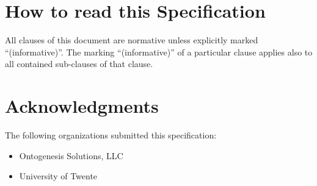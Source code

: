 
\section{How to read this Specification}



All clauses of this document are normative unless explicitly marked ``(informative)''. The marking ``(informative)'' of a particular clause applies also to all contained sub-clauses of that clause.


\section{Acknowledgments}

The following organizations submitted this specification: 

\begin{itemize}
\item Ontogenesis Solutions, LLC
\item University of Twente
\end{itemize}



